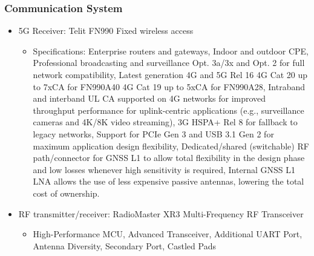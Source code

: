 \subsubsection{Communication System}
\begin{itemize}
    \item 5G Receiver: Telit FN990 Fixed wireless access
    \begin{itemize}
        \item Specifications: Enterprise routers and gateways, Indoor and outdoor CPE, Professional broadcasting and surveillance Opt. 3a/3x and Opt. 2 for full network compatibility, Latest generation 4G and 5G Rel 16 4G Cat 20 up to 7xCA for FN990A40 4G Cat 19 up to 5xCA for FN990A28, Intraband and interband UL CA supported on 4G networks for improved throughput performance for uplink-centric applications (e.g., surveillance cameras and 4K/8K video streaming), 3G HSPA+ Rel 8 for fallback to legacy networks, Support for PCIe Gen 3 and USB 3.1 Gen 2 for maximum application design flexibility, Dedicated/shared (switchable) RF path/connector for GNSS L1 to allow total flexibility in the design phase and low losses whenever high sensitivity is required, Internal GNSS L1 LNA allows the use of less expensive passive antennas, lowering the total cost of ownership.
    \end{itemize}
    \item RF transmitter/receiver: RadioMaster XR3 Multi-Frequency RF Transceiver
    \begin{itemize}
        \item High-Performance MCU, Advanced Transceiver, Additional UART Port, Antenna Diversity, Secondary Port, Castled Pads
    \end{itemize}
\end{itemize}
